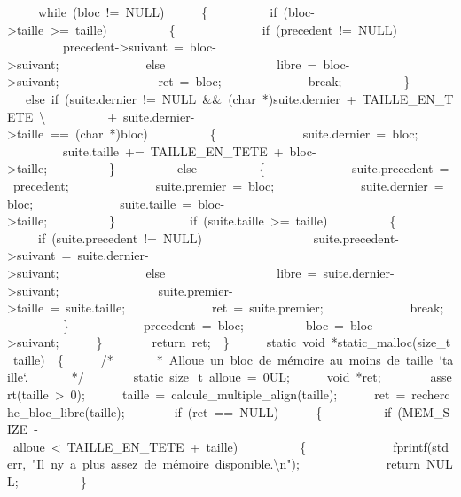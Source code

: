 \documentclass[]{article}
\begin{document}
\textbar{}\ \ \ \ \ while\ (bloc\ !=\ NULL)\ \textbar{}\ \ \ \ \ \{\ \textbar{}\ \ \ \ \ \ \ \ \ if\ (bloc-\textgreater{}taille\ \textgreater{}=\ taille)\ \textbar{}\ \ \ \ \ \ \ \ \ \{\ \textbar{}\ \ \ \ \ \ \ \ \ \ \ \ \ if\ (precedent\ !=\ NULL)\ \textbar{}\ \ \ \ \ \ \ \ \ \ \ \ \ \ \ \ \ precedent-\textgreater{}suivant\ =\ bloc-\textgreater{}suivant;\ \textbar{}\ \ \ \ \ \ \ \ \ \ \ \ \ else\ \textbar{}\ \ \ \ \ \ \ \ \ \ \ \ \ \ \ \ \ libre\ =\ bloc-\textgreater{}suivant;\ \textbar{}\ \ \textbar{}\ \ \ \ \ \ \ \ \ \ \ \ \ ret\ =\ bloc;\ \textbar{}\ \ \ \ \ \ \ \ \ \ \ \ \ break;\ \textbar{}\ \ \ \ \ \ \ \ \ \}\ \textbar{}\ \ \ \ \ \ \ \ \ else\ if\ (suite.dernier\ !=\ NULL\ \&\&\ (char\ *)suite.dernier\ +\ TAILLE\_EN\_TETE\ \textbackslash{}\ \textbar{}\ \ \ \ \ \ \ \ \ +\ suite.dernier-\textgreater{}taille\ ==\ (char\ *)bloc)\ \textbar{}\ \ \ \ \ \ \ \ \ \{\ \textbar{}\ \ \ \ \ \ \ \ \ \ \ \ \ suite.dernier\ =\ bloc;\ \textbar{}\ \ \ \ \ \ \ \ \ \ \ \ \ suite.taille\ +=\ TAILLE\_EN\_TETE\ +\ bloc-\textgreater{}taille;\ \textbar{}\ \ \ \ \ \ \ \ \ \}\ \textbar{}\ \ \ \ \ \ \ \ \ else\ \textbar{}\ \ \ \ \ \ \ \ \ \{\ \textbar{}\ \ \ \ \ \ \ \ \ \ \ \ \ suite.precedent\ =\ precedent;\ \textbar{}\ \ \ \ \ \ \ \ \ \ \ \ \ suite.premier\ =\ bloc;\ \textbar{}\ \ \ \ \ \ \ \ \ \ \ \ \ suite.dernier\ =\ bloc;\ \textbar{}\ \ \ \ \ \ \ \ \ \ \ \ \ suite.taille\ =\ bloc-\textgreater{}taille;\ \textbar{}\ \ \ \ \ \ \ \ \ \}\ \textbar{}\ \ \textbar{}\ \ \ \ \ \ \ \ \ if\ (suite.taille\ \textgreater{}=\ taille)\ \textbar{}\ \ \ \ \ \ \ \ \ \{\ \textbar{}\ \ \ \ \ \ \ \ \ \ \ \ \ if\ (suite.precedent\ !=\ NULL)\ \textbar{}\ \ \ \ \ \ \ \ \ \ \ \ \ \ \ \ \ suite.precedent-\textgreater{}suivant\ =\ suite.dernier-\textgreater{}suivant;\ \textbar{}\ \ \ \ \ \ \ \ \ \ \ \ \ else\ \textbar{}\ \ \ \ \ \ \ \ \ \ \ \ \ \ \ \ \ libre\ =\ suite.dernier-\textgreater{}suivant;\ \textbar{}\ \ \textbar{}\ \ \ \ \ \ \ \ \ \ \ \ \ suite.premier-\textgreater{}taille\ =\ suite.taille;\ \textbar{}\ \ \ \ \ \ \ \ \ \ \ \ \ ret\ =\ suite.premier;\ \textbar{}\ \ \ \ \ \ \ \ \ \ \ \ \ break;\ \textbar{}\ \ \ \ \ \ \ \ \ \}\ \textbar{}\ \ \textbar{}\ \ \ \ \ \ \ \ \ precedent\ =\ bloc;\ \textbar{}\ \ \ \ \ \ \ \ \ bloc\ =\ bloc-\textgreater{}suivant;\ \textbar{}\ \ \ \ \ \}\ \textbar{}\ \ \textbar{}\ \ \ \ \ return\ ret;\ \textbar{}\ \}\ \textbar{}\ \ \textbar{}\ \ \textbar{}\ static\ void\ *static\_malloc(size\_t\ taille)\ \textbar{}\ \{\ \textbar{}\ \ \ \ \ /*\ \textbar{}\ \ \ \ \ \ *\ Alloue\ un\ bloc\ de\ mémoire\ au\ moins\ de\ taille\ `taille`.\ \textbar{}\ \ \ \ \ \ */\ \textbar{}\ \ \textbar{}\ \ \ \ \ static\ size\_t\ alloue\ =\ 0UL;\ \textbar{}\ \ \ \ \ void\ *ret;\ \textbar{}\ \ \textbar{}\ \ \ \ \ assert(taille\ \textgreater{}\ 0);\ \textbar{}\ \ \ \ \ taille\ =\ calcule\_multiple\_align(taille);\ \textbar{}\ \ \ \ \ ret\ =\ recherche\_bloc\_libre(taille);\ \textbar{}\ \ \textbar{}\ \ \ \ \ if\ (ret\ ==\ NULL)\ \textbar{}\ \ \ \ \ \{\ \textbar{}\ \ \ \ \ \ \ \ \ if\ (MEM\_SIZE\ -\ alloue\ \textless{}\ TAILLE\_EN\_TETE\ +\ taille)\ \textbar{}\ \ \ \ \ \ \ \ \ \{\ \textbar{}\ \ \ \ \ \ \ \ \ \ \ \ \ fprintf(stderr,\ "Il\ n\textquotesingle{}y\ a\ plus\ assez\ de\ mémoire\ disponible.\textbackslash{}n");\ \textbar{}\ \ \ \ \ \ \ \ \ \ \ \ \ return\ NULL;\ \textbar{}\ \ \ \ \ \ \ \ \ \}\ \textbar{}\ \ 
\end{document}
